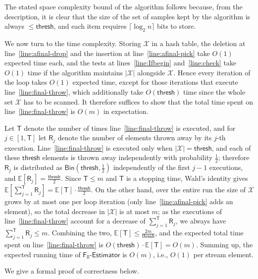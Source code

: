 \documentclass[a4paper,UKenglish,cleveref, autoref, thm-restate]{lipics-v2021}
\makeatletter
\newenvironment{proof*}[1][\proofname]{\par
  \pushQED{\qed}
  \normalfont \partopsep=\z@skip \topsep=\z@skip
  \trivlist
  \item[\hskip\labelsep
        \itshape
    #1\@addpunct{.}]\ignorespaces
}{
  \popQED\endtrivlist\@endpefalse
}
\newcommand{\hybrid}{\ensuremath{\mathsf{F_0\mbox{-}Estimator}}}
\newcommand{\thresh}{\mathsf{thresh}}
\makeatother
\begin{document}
\begin{proof*}
The stated space complexity bound of the algorithm follows because, from the description, it is clear that the size of the set of samples kept by the algorithm is always $\leq \thresh$, and each item requires $\lceil\log_2 n\rceil$ bits to store. 

We now turn to the time complexity. Storing $\mathcal{X}$ in a hash table, the deletion at line~\ref{line:afinal-drop} and the insertion at line~\ref{line:afinal-pick} take $O(1)$ expected time each, and the tests at lines~\ref{line:Ifbegin} and~\ref{line:check} take $O(1)$ time if the algorithm maintains $|\mathcal{X}|$ alongside $\mathcal{X}$. Hence every iteration of the loop takes $O(1)$ expected time, except for those iterations that execute line~\ref{line:final-throw}, which additionally take $O(\thresh)$ time since the whole set $\mathcal{X}$ has to be scanned. It therefore suffices to show that the total time spent on line~\ref{line:final-throw} is $O(m)$ in expectation.

Let $\mathsf{T}$ denote the number of times line~\ref{line:final-throw} is executed, and for $j \in [1,\mathsf{T}]$ let $\mathsf{R}_j$ denote the number of elements thrown away by its $j$-th execution. Line~\ref{line:final-throw} is executed only when $|\mathcal{X}| = \thresh$, and each of these $\thresh$ elements is thrown away independently with probability $\frac{1}{2}$; therefore $\mathsf{R}_j$ is distributed as $\mathsf{Bin}(\thresh, \frac{1}{2})$ independently of the first $j-1$ executions, and $\mathbb{E}[\mathsf{R}_j] = \frac{\thresh}{2}$. Since $\mathsf{T} \leq m$ and $\mathsf{T}$ is a stopping time, Wald's identity gives $\mathbb{E}\left[\sum_{j=1}^{\mathsf{T}} \mathsf{R}_j\right] = \mathbb{E}[\mathsf{T}]\cdot \frac{\thresh}{2}$. On the other hand, over the entire run the size of $\mathcal{X}$ grows by at most one per loop iteration (only line~\ref{line:afinal-pick} adds an element), so the total decrease in $|\mathcal{X}|$ is at most $m$; as the executions of line~\ref{line:final-throw} account for a decrease of $\sum_{j=1}^{\mathsf{T}} \mathsf{R}_j$, we always have $\sum_{j=1}^{\mathsf{T}} \mathsf{R}_j \leq m$. Combining the two, $\mathbb{E}[\mathsf{T}] \leq \frac{2m}{\thresh}$, and the expected total time spent on line~\ref{line:final-throw} is $O(\thresh) \cdot \mathbb{E}[\mathsf{T}] = O(m)$. Summing up, the expected running time of $\hybrid$ is $O(m)$, i.e., $O(1)$ per stream element.


We give a formal proof of correctness below. 



\end{proof*}
\end{document}
